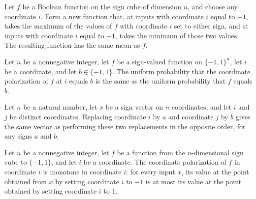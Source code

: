 \begin{theorem}
\label{FABL.mean_coordinatePolarization}
\leanok
{}
Let $f$ be a Boolean function on the sign cube of dimension $n$, and choose any
coordinate $i$. Form a new function that, at inputs with coordinate $i$ equal to $+1$,
takes the maximum of the values of $f$ with coordinate $i$ set to either sign, and at
inputs with coordinate $i$ equal to $-1$, takes the minimum of those two values. The
resulting function has the same mean as $f$.
\end{theorem}

\begin{theorem}
\label{FABL.uniformProbability_coordinatePolarization_eq}
\leanok
{}
Let $n$ be a nonnegative integer, let $f$ be a sign-valued function on $\{-1,1\}^n$,
let $i$ be a coordinate, and let $b\in\{-1,1\}$. The uniform probability that the
coordinate polarization of $f$ at $i$ equals $b$ is the same as the uniform probability
that $f$ equals $b$.
\end{theorem}

\begin{theorem}
\label{FABL.setCoordinate_comm_of_ne}
\leanok
{}
Let $n$ be a natural number, let $x$ be a sign vector on $n$ coordinates, and let $i$
and $j$ be distinct coordinates. Replacing coordinate $i$ by $a$ and coordinate $j$ by
$b$ gives the same vector as performing these two replacements in the opposite order,
for any signs $a$ and $b$.
\end{theorem}

\begin{theorem}
\label{FABL.isMonotoneInCoordinate_coordinatePolarization_self}
\leanok
{}
Let $n$ be a nonnegative integer, let $f$ be a function from the $n$-dimensional sign
cube to $\{-1,1\}$, and let $i$ be a coordinate. The coordinate polarization of $f$ in
coordinate $i$ is monotone in coordinate $i$: for every input $x$, its value at the
point obtained from $x$ by setting coordinate $i$ to $-1$ is at most its value at the
point obtained by setting coordinate $i$ to $1$.
\end{theorem}

